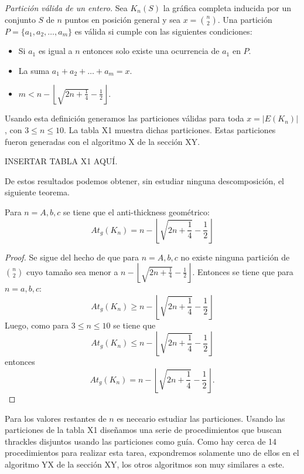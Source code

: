     \begin{definition}{\emph{Partición válida de un entero.}}
      Sea $K_n(S)$ la gráfica completa inducida por un conjunto $S$ de $n$ puntos en posición general y sea $x=\binom{n}{2}$. Una partición $P=\{a_1,a_2,\dots,a_m\}$ es válida si cumple con las siguientes condiciones:
      \begin{itemize}
        \item Si $a_1$ es igual a $n$ entonces solo existe una ocurrencia de $a_1$ en $P$.
        \item La suma $a_1 + a_2 + \dots + a_m = x$.
        \item $m < n - \left\lfloor\sqrt{2n+\frac{1}{4}} - \frac{1}{2}\right\rfloor$.
      \end{itemize}
    \end{definition}

    Usando esta definición generamos las particiones válidas para toda $x=|E(K_n)|$, con $ 3 \leq n \leq 10$. La tabla X1 muestra dichas particiones. Estas particiones fueron generadas con el algoritmo X de la sección XY.

    INSERTAR TABLA X1 AQUÍ.

    De estos resultados podemos obtener, sin estudiar ninguna descomposición, el siguiente teorema.
    \begin{theorem}
      Para $n=A,b,c$ se tiene que el anti-thickness geométrico:
      \[At_g(K_n) = n - \left\lfloor\sqrt{2n+\frac{1}{4}} - \frac{1}{2}\right\rfloor \]
    \end{theorem}
    \begin{proof}
      Se sigue del hecho de que para $n=A,b,c$ no existe ninguna partición de
      $\binom{n}{2}$ cuyo tamaño sea menor a $n -
      \left\lfloor\sqrt{2n+\frac{1}{4}} - \frac{1}{2}\right\rfloor$. Entonces
      se tiene que para $n=a,b,c$: \[ At_g(K_n) \geq n -
      \left\lfloor\sqrt{2n+\frac{1}{4}} - \frac{1}{2}\right\rfloor\]
      Luego, como para $ 3 \leq n \leq 10$ se tiene que
      \[At_g(K_n) \leq n - \left\lfloor\sqrt{2n+\frac{1}{4}} -
      \frac{1}{2}\right\rfloor \]
      entonces \[At_g(K_n) = n - \left\lfloor\sqrt{2n+\frac{1}{4}} -
      \frac{1}{2}\right\rfloor. \]
    \end{proof}

    Para los valores restantes de $n$ es neceario estudiar las particiones.
    Usando las particiones de la tabla X1 diseñamos una serie de procedimientos
    que buscan thrackles disjuntos usando las particiones como guía. Como hay
    cerca de 14 procedimientos para realizar esta tarea, expondremos solamente
    uno de ellos en el algoritmo YX de la sección XY, los otros algoritmos son
    muy similares a este.

